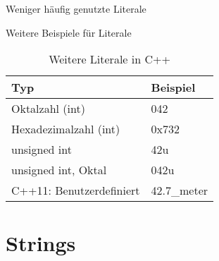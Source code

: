 \begin{frame}{Weniger häufig genutzte Literale}
    \begin{block}{Weitere Beispiele für Literale}
        \begin{table}
        \center
        \begin{tabular}{ll}
            \toprule
            Typ & Beispiel \\
            \midrule
            Oktalzahl (int) & 042 \\
            Hexadezimalzahl (int) & 0x732 \\
            \midrule
            \pause
            unsigned int & 42u \\
            unsigned int, Oktal & 042u \\
            \midrule
            \pause
            C++11: Benutzerdefiniert & 42.7\_meter \\
            \bottomrule
        \end{tabular}
        \caption{Weitere Literale in C++}
        \end{table}
    \end{block}
\end{frame}

\section{Strings}